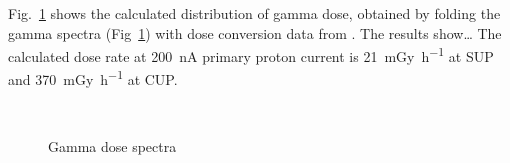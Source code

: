 \documentclass[11pt,a4paper]{IEEEtran}
\let\MYoriglatexcaption\caption
\renewcommand{\caption}[2][\relax]{\MYoriglatexcaption[#2]{#2}}
\begin{document}
Fig.~\ref{fig:GammaDoseEnergy} shows the calculated distribution of gamma dose, obtained by folding the gamma spectra (Fig~\ref{fig:GammaDoseEnergy}) with dose conversion data from \cite{tbd}.
The results show\ldots{}
The calculated dose rate at \SI{200}{\nA} primary proton current is \SI{21}{\milli\gray\per\hour} at SUP and \SI{370}{\milli\gray\per\hour} at CUP.

\begin{figure}
    \centering
    \vspace{2in}
    \\
    \caption{Gamma dose spectra}
    \label{fig:GammaDoseEnergy}
\end{figure}
\end{document}

